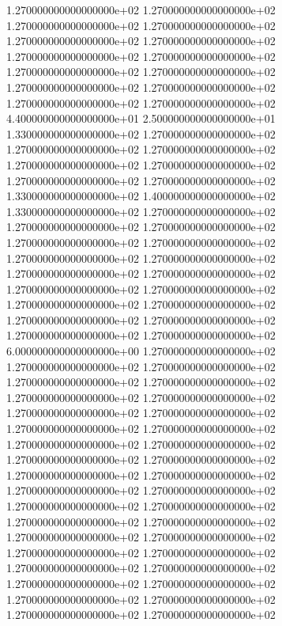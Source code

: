 1.270000000000000000e+02 1.270000000000000000e+02 1.270000000000000000e+02 1.270000000000000000e+02 1.270000000000000000e+02 1.270000000000000000e+02 1.270000000000000000e+02 1.270000000000000000e+02 1.270000000000000000e+02 1.270000000000000000e+02 1.270000000000000000e+02 1.270000000000000000e+02 1.270000000000000000e+02 1.270000000000000000e+02 4.400000000000000000e+01 2.500000000000000000e+01 1.330000000000000000e+02 1.270000000000000000e+02 1.270000000000000000e+02 1.270000000000000000e+02 1.270000000000000000e+02 1.270000000000000000e+02 1.270000000000000000e+02 1.270000000000000000e+02 1.330000000000000000e+02 1.400000000000000000e+02 1.330000000000000000e+02 1.270000000000000000e+02 1.270000000000000000e+02 1.270000000000000000e+02 1.270000000000000000e+02 1.270000000000000000e+02 1.270000000000000000e+02 1.270000000000000000e+02 1.270000000000000000e+02 1.270000000000000000e+02 1.270000000000000000e+02 1.270000000000000000e+02 1.270000000000000000e+02 1.270000000000000000e+02 1.270000000000000000e+02 1.270000000000000000e+02 1.270000000000000000e+02 1.270000000000000000e+02 6.000000000000000000e+00 1.270000000000000000e+02 1.270000000000000000e+02 1.270000000000000000e+02 1.270000000000000000e+02 1.270000000000000000e+02 1.270000000000000000e+02 1.270000000000000000e+02 1.270000000000000000e+02 1.270000000000000000e+02 1.270000000000000000e+02 1.270000000000000000e+02 1.270000000000000000e+02 1.270000000000000000e+02 1.270000000000000000e+02 1.270000000000000000e+02 1.270000000000000000e+02 1.270000000000000000e+02 1.270000000000000000e+02 1.270000000000000000e+02 1.270000000000000000e+02 1.270000000000000000e+02 1.270000000000000000e+02 1.270000000000000000e+02 1.270000000000000000e+02 1.270000000000000000e+02 1.270000000000000000e+02 1.270000000000000000e+02 1.270000000000000000e+02 1.270000000000000000e+02 1.270000000000000000e+02 1.270000000000000000e+02 1.270000000000000000e+02 1.270000000000000000e+02 1.270000000000000000e+02 1.270000000000000000e+02
